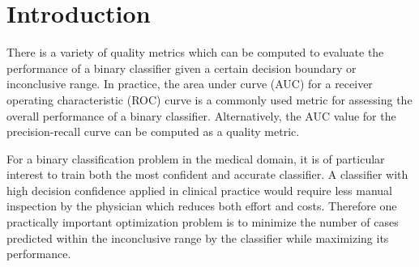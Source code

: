 \section{Introduction}
\label{sec:intro}









There is a variety of quality metrics which can be computed to evaluate the performance of a binary classifier 
given a certain decision boundary or inconclusive range.
In practice, the area under curve (AUC) for a receiver operating characteristic (ROC) curve is a commonly used metric 
for assessing the overall performance of a binary classifier.
Alternatively, the AUC value for the precision-recall curve can be computed as a quality metric. 

For a binary classification problem in the medical domain, it is of particular interest to train both the most confident and 
accurate classifier.
A classifier with high decision confidence applied in clinical practice would require less manual inspection by the
physician which reduces both effort and costs.
Therefore one practically important optimization problem is to minimize the number of cases predicted within the inconclusive range 
by the classifier while maximizing its performance.


